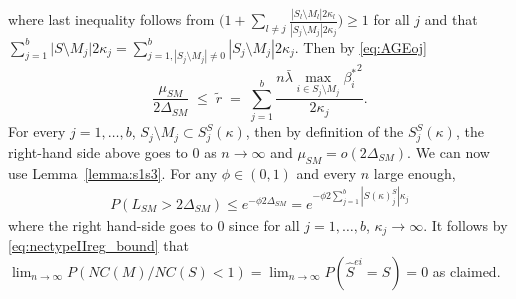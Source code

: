 \documentclass[
  12pt]{article}
\begin{document}
where last inequality follows from $\Big(1+\sum_{l\neq j}\frac{|S_l\setminus M_l|2\kappa_l}{|S_j\setminus M_j|2\kappa_j}\Big)\geq 1$ for all $j$ and that $\sum_{j=1}^b \big|S\setminus M_j\big|2\kappa_j=\sum_{j=1,|S_j\setminus M_j|\neq 0 }^b|S_j\setminus M_j|2\kappa_j$. Then by \eqref{eq:AGEoj}
$$\frac{\mu_{SM}}{2\Delta_{SM}}\;\leq \;\tilde{r}\;=\;\sum_{j=1}^b\frac{n\bar{\lambda}\max_{i\in S_j\setminus M_j}{\beta_i^*}^2}{2\kappa_j}.$$
For every $j=1,\ldots,b$, $S_j\setminus M_j \subset S_j^{S}(\kappa)$, then by definition of the $S_j^{S}(\kappa)$, the right-hand 
side above goes to 0 as $n \to \infty$ and  $\mu_{SM}=o(2\Delta_{SM})$. We can now use Lemma~\ref{lemma:s1s3}. %
For any $\phi \in (0,1)$ and every $n$ large enough,
\begin{align}
    P(L_{SM}> 2\Delta_{SM}) \leq e^{-\phi2\Delta_{SM}} = e^{-\phi2\sum_{j=1}^b|S(\kappa)_j^S|\kappa_j}
\nonumber
\end{align} 
where the right hand-side goes to 0 since for all $j=1,\ldots,b$, $\kappa_j \to \infty$. It follows by \eqref{eq:nectypeIIreg_bound} that $\lim_{n\to\infty}P\left( NC(M)/NC(S) < 1  \right)=\lim_{n\to\infty}P(\hat{S}^{ei}=S)=0$ as claimed.
\end{document}
